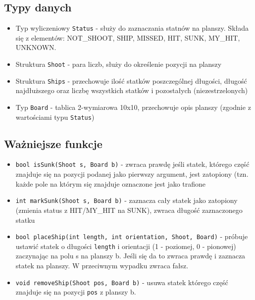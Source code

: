 \documentclass[a4paper]{article}
\begin{document}
\subsection{Typy danych}
\begin{itemize}
    \item Typ wyliczeniowy \texttt{Status} - służy do zaznaczania statnów na planszy. Składa się z elementów:
    NOT\_SHOOT, SHIP, MISSED, HIT, SUNK, MY\_HIT, UNKNOWN.
    \item Struktura \texttt{Shoot} - para liczb, służy do określenie pozycji na planszy
    \item Struktura \texttt{Ships} - przechowuje ilość statków poszczególnej długości, 
        długość najdłuższego oraz liczbę wszystkich statków i pozostałych (niezestrzelonych)
    \item Typ \texttt{Board} - tablica 2-wymiarowa 10x10, przechowuje opis planszy (zgodnie z wartościami typu \texttt{Status})
\end{itemize}

\subsection{Ważniejsze funkcje}
\begin{itemize}
    \item \texttt{bool isSunk(Shoot s, Board b)} - zwraca prawdę jeśli statek, którego część znajduje się
na pozycji podanej jako pierwszy argument, jest zatopiony (tzn. każde pole na którym się znajduje oznaczone jest
jako trafione
    \item \texttt{int markSunk(Shoot s, Board b)} - zaznacza cały statek jako zatopiony (zmienia status z HIT/MY\_HIT na SUNK),
zwraca długość zaznaczonego statku
    \item \texttt{bool placeShip(int length, int orientation, Shoot, Board)} - próbuje ustawić statek
o długości \texttt{length} i orientacji (1 - poziomej, 0 - pionowej) zaczynając na polu s na planszy b.
Jeśli się da to zwraca prawdę i zaznacza statek na planszy. W przeciwnym wypadku zwraca fałsz.
    \item \texttt{void removeShip(Shoot pos, Board b)} - usuwa statek którego część znajduje się na pozycji \texttt{pos} z planszy b.
\end{itemize}
\end{document}
